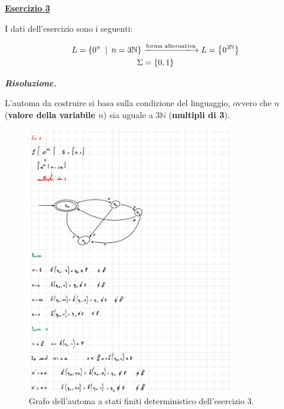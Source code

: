 \documentclass[a4paper]{article}
\begin{document}
	\newpage
	
	\noindent
	\textcolor{Red3}{\textbf{\underline{Esercizio 3}}}\newline
	
	\noindent
	I dati dell'esercizio sono i seguenti:
	
	\begin{gather*}
		L = \left\{0^{n} \hspace{0.5em} | \hspace{0.5em} n = 3\mathbb{N}\right\} \xlongrightarrow{\text{forma alternativa}} L = \left\{0^{3\mathbb{N}}\right\}\\
		\Sigma = \left\{0, 1\right\}
	\end{gather*}\newline
	
	\noindent
	\textcolor{Green4}{\textbf{\emph{Risoluzione.}}}\newline
	
	\noindent
	L'automa da costruire si basa sulla condizione del linguaggio, ovvero che $n$ (\textbf{valore della variabile $n$}) sia uguale a $3\mathbb{N}$ (\textbf{multipli di 3}).
	
	\begin{figure}[!htp]
		\centering
		\includegraphics[width=0.8\textwidth]{img/esercitazioni/01_exe3.pdf}
		\caption{Grafo dell'automa a stati finiti deterministico dell'esercizio 3.}\label{ASFD-esercizio_3}
	\end{figure}
\end{document}
